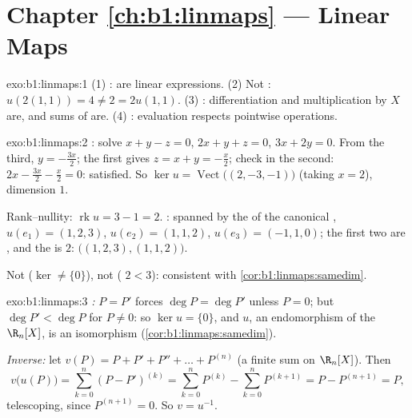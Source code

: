 \section*{Chapter \ref{ch:b1:linmaps} --- Linear Maps}

\begin{solution}{exo:b1:linmaps:1}
(1) :  are linear expressions. (2) Not :
$u(2(1,1)) = 4 \neq 2 = 2u(1,1)$. (3) : differentiation and
multiplication by $X$ are, and sums of  are. (4) :
evaluation respects pointwise operations.
\end{solution}

\begin{solution}{exo:b1:linmaps:2}
: solve $x + y - z = 0$, $2x + y + z = 0$, $3x + 2y = 0$.
From the third, $y = -\frac{3x}{2}$; the first gives $z = x + y =
-\frac x2$; check in the second: $2x - \frac{3x}{2} - \frac x2 = 0$:
satisfied. So $\ker u = \operatorname{Vect}\bigl((2, -3, -1)\bigr)$
(taking $x = 2$), dimension $1$.

Rank--nullity: $\operatorname{rk} u = 3 - 1 = 2$. : spanned by
the  of the canonical , $u(e_1) = (1,2,3)$, $u(e_2) =
(1,1,2)$, $u(e_3) = (-1,1,0)$; the first two are , and the 
is $2$:  $\bigl((1,2,3), (1,1,2)\bigr)$.

Not  ($\ker \neq \{0\}$), not  ( $2 < 3$):
consistent with \cref{cor:b1:linmaps:samedim}.
\end{solution}

\begin{solution}{exo:b1:linmaps:3}
\emph{:} $P = P'$ forces $\deg P = \deg P'$ unless $P = 0$;
but $\deg P' < \deg P$ for $P \neq 0$: so $\ker u = \{0\}$, and $u$,
an  endomorphism of the  $\R_n[X]$, is an
isomorphism (\cref{cor:b1:linmaps:samedim}).

\emph{Inverse:} let $v(P) = P + P' + P'' + \dots + P^{(n)}$ (a
finite sum on $\R_n[X]$). Then
\[
v\bigl(u(P)\bigr) = \sum_{k=0}^{n} (P - P')^{(k)}
= \sum_{k=0}^{n} P^{(k)} - \sum_{k=0}^{n} P^{(k+1)}
= P - P^{(n+1)} = P ,
\]
telescoping, since $P^{(n+1)} = 0$. So $v = u^{-1}$.
\end{solution}

